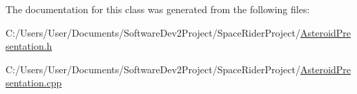 The documentation for this class was generated from the following files\+:\begin{DoxyCompactItemize}
\item 
C\+:/\+Users/\+User/\+Documents/\+Software\+Dev2\+Project/\+Space\+Rider\+Project/\hyperlink{_asteroid_presentation_8h}{Asteroid\+Presentation.\+h}\item 
C\+:/\+Users/\+User/\+Documents/\+Software\+Dev2\+Project/\+Space\+Rider\+Project/\hyperlink{_asteroid_presentation_8cpp}{Asteroid\+Presentation.\+cpp}\end{DoxyCompactItemize}

